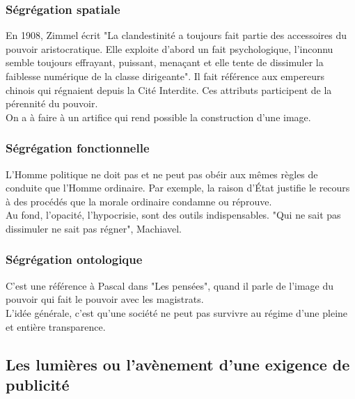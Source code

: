 \documentclass[10pt, a4paper, openany]{book}
\begin{document}
\subsubsection{Ségrégation spatiale}

En 1908, Zimmel écrit "La clandestinité a toujours fait partie des accessoires du pouvoir aristocratique. Elle exploite d'abord un fait psychologique, l'inconnu semble toujours effrayant, puissant, menaçant et elle tente de dissimuler la faiblesse numérique de la classe dirigeante". Il fait référence aux empereurs chinois qui régnaient depuis la Cité Interdite. Ces attributs participent de la pérennité du pouvoir. \\
On a à faire à un artifice qui rend possible la construction d'une image. 

\subsubsection{Ségrégation fonctionnelle}

L'Homme politique ne doit pas et ne peut pas obéir aux mêmes règles de conduite que l'Homme ordinaire. Par exemple, la raison d'État justifie le recours à des procédés que la morale ordinaire condamne ou réprouve. \\
Au fond, l'opacité, l'hypocrisie, sont des outils indispensables. "Qui ne sait pas dissimuler ne sait pas régner", Machiavel. 

\subsubsection{Ségrégation ontologique}

C'est une référence à Pascal dans "Les pensées", quand il parle de l'image du pouvoir qui fait le pouvoir avec les magistrats. \\
L'idée générale, c'est qu'une société ne peut pas survivre au régime d'une pleine et entière transparence. 

\subsection{Les lumières ou l'avènement d'une exigence de publicité}
\end{document}
